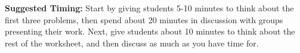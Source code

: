 \documentclass[noauthor, nooutcomes, handout]{ximera}
\begin{document}
\begin{instructorNotes}
\begin{itemize}
 \end{itemize}


{\bf Suggested Timing:}  Start by giving students 5-10 minutes to think about the first three problems, then spend about 20 minutes in discussion with groups presenting their work. Next, give students about 10 minutes to think about the rest of the worksheet, and then discuss as much as you have time for.
\end{instructorNotes}
\end{document}

